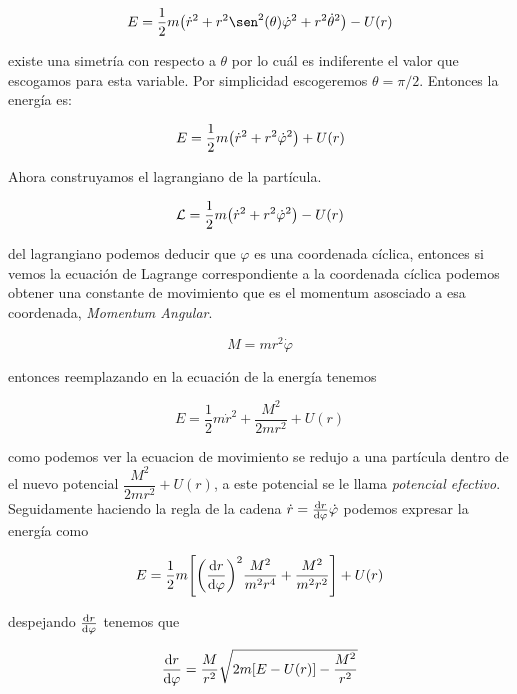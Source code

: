 \documentclass[../Main.tex]{subfiles}
\begin{document}
\begin{equation}
    E = \dfrac{1}{2}m\qty(\dot{r}^{2}+r^{2}\sen^{2}(\theta)\dot{\varphi}^{2}+r^{2}\dot{\theta}^{2}) - U(r)
\end{equation}

existe una simetría con respecto a $\theta$ por lo cuál es indiferente el valor que escogamos para esta variable. Por simplicidad escogeremos $\theta=\pi/2$. Entonces la energía es:

\begin{equation}
    E = \dfrac{1}{2}m\qty(\dot{r}^{2}+r^{2}\dot{\varphi}^{2}) + U(r)
\end{equation}

Ahora construyamos el lagrangiano de la partícula.

\begin{equation}
    \mathcal{L} = \dfrac{1}{2}m\qty(\dot{r}^{2}+r^{2}\dot{\varphi}^{2}) - U(r)
\end{equation}

del lagrangiano podemos deducir que $\varphi$ es una coordenada cíclica, entonces si vemos la ecuación de Lagrange correspondiente a la coordenada cíclica podemos obtener
una constante de movimiento que es el momentum asosciado a esa coordenada, \textit{Momentum Angular}.

\begin{equation}
    M = m r^{2} \dot{\varphi}
\end{equation}

entonces reemplazando en la ecuación  de la energía tenemos

\begin{equation}
    E = \dfrac{1}{2}m\dot{r}^{2}+\dfrac{M^{2}}{2mr^{2}} + U(r)
\end{equation}

como podemos ver la ecuacion de movimiento se redujo a una partícula dentro de el nuevo potencial $\dfrac{M^{2}}{2mr^{2}} + U(r)$, a este potencial se le llama \textit{potencial efectivo}. Seguidamente haciendo la regla de la cadena $\dot{r} = \dv{r}{\varphi} \dot{\varphi}$ podemos expresar la energía como

\begin{equation}
    E = \dfrac{1}{2}m\qty[\qty(\dv{r}{\varphi})^{2}\dfrac{M^{2}}{m^{2}r^{4}}+\dfrac{M^{2}}{m^{2}r^{2}}] + U(r)
\end{equation}

despejando $\dv{r}{\varphi}$ tenemos que

\begin{equation}
    \dv{r}{\varphi} = \dfrac{M}{r^{2}}\sqrt{2m\qty[E-U(r)]-\dfrac{M^{2}}{r^{2}}}
\end{equation}
\end{document}
